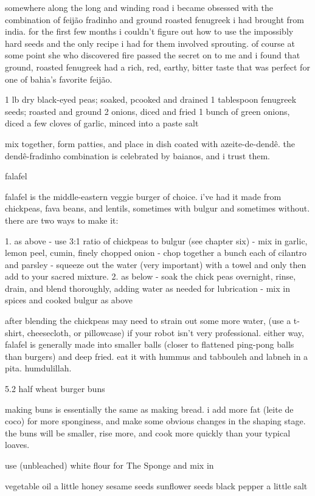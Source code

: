 somewhere along the long and winding road i became obsessed with the combination of feij\~{a}o fradinho and ground roasted fenugreek i had brought from india. for the first few months i couldn't figure out how to use the impossibly hard seeds and the only recipe i had for them involved sprouting. of course at some point she who discovered fire passed the secret on to me and i found that ground, roasted fenugreek had a rich, red, earthy, bitter taste that was perfect for one of bahia's favorite feij\~{a}o.

1 lb dry black-eyed peas; soaked, pcooked and drained
1 tablespoon fenugreek seeds; roasted and ground
2 onions, diced and fried
1 bunch of green onions, diced
a few cloves of garlic, minced into a paste
salt

mix together, form patties, and place in dish coated with azeite-de-dend\^{e}. the dend\^{e}-fradinho combination is celebrated by baianos, and i trust them.

falafel

falafel is the middle-eastern veggie burger of choice. i've had it made from chickpeas, fava beans, and lentils, sometimes with bulgur and sometimes without. there are two ways to make it:

1. as above
-	use 3:1 ratio of chickpeas to bulgur (see chapter six)
-	mix in garlic, lemon peel, cumin, finely chopped onion
-	chop together a bunch each of cilantro and parsley
- squeeze out the water (very important) with a towel and only then add to your sacred mixture.
2. as below
-	soak the chick peas overnight, rinse, drain, and blend thoroughly, adding water as needed for lubrication
-	mix in spices and cooked bulgur as above

after blending the chickpeas may need to strain out some more water, (use a t-shirt, cheesecloth, or pillowcase) if your robot isn't very professional. either way, falafel is generally made into smaller balls (closer to flattened ping-pong balls than burgers) and deep fried. eat it with hummus and tabbouleh and labneh in a pita. humdulillah.

5.2  half wheat burger buns

making buns is essentially the same as making bread. i add more fat (leite de coco) for more sponginess, and make some obvious changes in the shaping stage. the buns will be smaller, rise more, and cook more quickly than your typical loaves.

use (unbleached) white flour for The Sponge and mix in

	vegetable oil
	a little honey
	sesame seeds
	sunflower seeds
	black pepper
	a little salt

